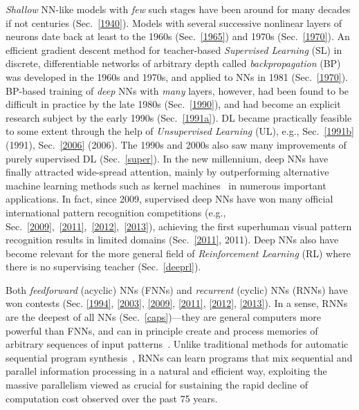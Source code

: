 \documentclass[letterpaper]{article}
\begin{document}
{\em Shallow} NN-like models with {\em few} such stages have been around for many decades 
if not centuries  (Sec.~\ref{1940}).
Models with several successive nonlinear layers of  neurons date back at least 
to the 1960s (Sec.~\ref{1965}) and  1970s (Sec.~\ref{1970}).
An efficient gradient descent method for teacher-based {\em Supervised Learning} (SL) in discrete,
differentiable networks 
of arbitrary depth 
called {\em  backpropagation} (BP)
was developed in the 1960s and 1970s, and applied to NNs in 1981 (Sec.~\ref{1970}).  
BP-based 
training of {\em deep} NNs with {\em many} layers, however, 
had been found to be difficult in practice by the late 1980s (Sec.~\ref{1990}), and had
become an explicit research subject 
by the early 1990s (Sec.~\ref{1991a}). 
DL became 
practically feasible to some extent through the help of
{\em Unsupervised Learning} (UL), e.g., Sec.~\ref{1991b} (1991), Sec.~\ref{2006} (2006).
The 1990s and 2000s also saw many improvements of 
purely supervised DL (Sec.~\ref{super}). 
In the new millennium, deep NNs have finally attracted wide-spread attention,
mainly by outperforming alternative machine learning methods
such as kernel machines~\citep{Vapnik:95,advkernel}
in numerous important applications.
In fact, since 2009,
supervised deep NNs
have won many
official international pattern recognition competitions (e.g.,
Sec.~\ref{2009},~\ref{2011},~\ref{2012},~\ref{2013}),  
achieving the first superhuman visual pattern recognition results in
limited domains (Sec.~\ref{2011}, 2011).
Deep NNs also have become relevant for the more general field of 
{\em Reinforcement Learning} (RL) where there is no supervising teacher (Sec.~\ref{deeprl}).


Both {\em feedforward} (acyclic) NNs (FNNs)
and {\em recurrent} (cyclic) NNs (RNNs) have won contests 
(Sec. \ref{1994}, \ref{2003}, \ref{2009}, \ref{2011}, \ref{2012}, \ref{2013}). 
In a sense, RNNs are the deepest of all NNs (Sec.~\ref{caps})---they are general computers
more powerful than FNNs, 
and can in principle create and process
 memories of arbitrary sequences of input patterns~\citep[e.g.,][]{siegelmann91turing,schmidhuber1990}. 
Unlike traditional methods for automatic sequential program synthesis~\citep[e.g.,][]{waldinger69,balzer1985,soloway1986,Deville:94}, RNNs can learn programs that mix sequential and parallel information processing in a natural and efficient way, exploiting the massive parallelism viewed as crucial for sustaining the rapid decline of computation cost observed over the past 75 years. 
\end{document}

